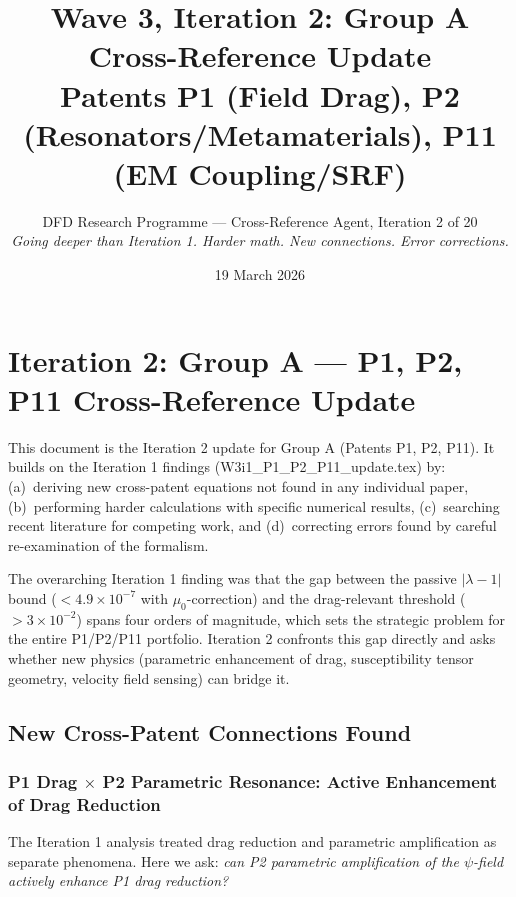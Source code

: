 \documentclass[11pt,twocolumn]{article}
\title{\textbf{Wave 3, Iteration 2: Group A Cross-Reference Update}\\
\large Patents P1 (Field Drag), P2 (Resonators/Metamaterials), P11 (EM Coupling/SRF)}
\author{DFD Research Programme --- Cross-Reference Agent, Iteration 2 of 20\\
\textit{Going deeper than Iteration 1. Harder math. New connections. Error corrections.}}
\date{19 March 2026}
\newcommand{\lam}{\lambda}
\begin{document}
\maketitle

\section{Iteration 2: Group A --- P1, P2, P11 Cross-Reference Update}

This document is the Iteration 2 update for Group A (Patents P1, P2, P11).
It builds on the Iteration 1 findings (W3i1\_P1\_P2\_P11\_update.tex) by:
(a)~deriving new cross-patent equations not found in any individual paper,
(b)~performing harder calculations with specific numerical results,
(c)~searching recent literature for competing work,
and (d)~correcting errors found by careful re-examination of the formalism.

The overarching Iteration 1 finding was that the gap between the passive
$|\lam-1|$ bound ($<4.9\times10^{-7}$ with $\mu_0$-correction) and the
drag-relevant threshold ($>3\times10^{-2}$) spans four orders of magnitude,
which sets the strategic problem for the entire P1/P2/P11 portfolio.
Iteration 2 confronts this gap directly and asks whether new physics
(parametric enhancement of drag, susceptibility tensor geometry, velocity
field sensing) can bridge it.

\subsection{New Cross-Patent Connections Found}
\label{sec:connections}

\subsubsection{P1 Drag $\times$ P2 Parametric Resonance: Active
  Enhancement of Drag Reduction}
\label{sec:p1_p2}

The Iteration 1 analysis treated drag reduction and parametric amplification
as separate phenomena. Here we ask: \emph{can P2 parametric amplification of
the $\psi$-field actively enhance P1 drag reduction?}
\end{document}
